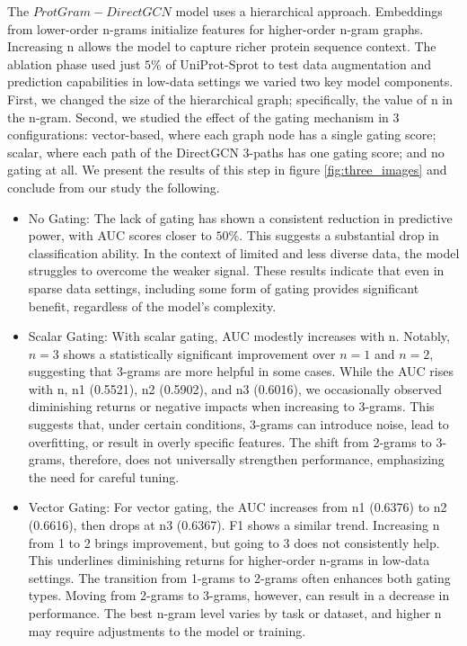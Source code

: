 \documentclass[utf8]{FrontiersinHarvard}
\begin{document}
The $ProtGram-DirectGCN$ model uses a hierarchical approach. Embeddings from lower-order n-grams initialize features for higher-order n-gram graphs. Increasing n allows the model to capture richer protein sequence context. The ablation phase used just $5\%$ of UniProt-Sprot to test data augmentation and prediction capabilities in low-data settings we varied two key model components. First, we changed the size of the hierarchical graph; specifically, the value of n in the n-gram. Second, we studied the effect of the gating mechanism in 3 configurations: vector-based, where each graph node has a single gating score; scalar, where each path of the DirectGCN 3-paths has one gating score; and no gating at all. We present the results of this step in figure \ref{fig:three_images} and conclude from our study the following.

\begin{itemize}
	\item{No Gating}: The lack of gating has shown a consistent reduction in predictive power, with AUC scores closer to $50\%$. This suggests a substantial drop in classification ability. In the context of limited and less diverse data, the model struggles to overcome the weaker signal. These results indicate that even in sparse data settings, including some form of gating provides significant benefit, regardless of the model's complexity. 
	
	\item{Scalar Gating}: With scalar gating, AUC modestly increases with n. Notably, $n=3$ shows a statistically significant improvement over $n=1$ and $n=2$, suggesting that 3-grams are more helpful in some cases. While the AUC rises with n, n1 (0.5521), n2 (0.5902), and n3 (0.6016), we occasionally observed diminishing returns or negative impacts when increasing to 3-grams. This suggests that, under certain conditions, 3-grams can introduce noise, lead to overfitting, or result in overly specific features. The shift from 2-grams to 3-grams, therefore, does not universally strengthen performance, emphasizing the need for careful tuning.
	
	\item{Vector Gating}: For vector gating, the AUC increases from n1 (0.6376) to n2 (0.6616), then drops at n3 (0.6367). F1 shows a similar trend. Increasing n from 1 to 2 brings improvement, but going to 3 does not consistently help. This underlines diminishing returns for higher-order n-grams in low-data settings. The transition from 1-grams to 2-grams often enhances both gating types. Moving from 2-grams to 3-grams, however, can result in a decrease in performance. The best n-gram level varies by task or dataset, and higher n may require adjustments to the model or training.
\end{itemize}
\end{document}
